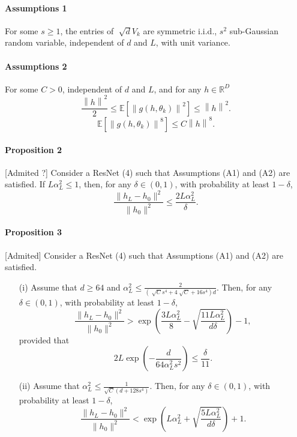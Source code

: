 \documentclass{report}
\theoremstyle{plain}%
\theoremstyle{definition}
\theoremstyle{remark}
\begin{document}
\paragraph*{Assumptions 1}
For some $ s \geq 1 $, the entries of $ \sqrt[]{d}V_k $ are symmetric i.i.d., $ s^2 $ sub-Gaussian random variable, independent of $ d $ and $ L $, with unit variance. 

\paragraph*{Assumptions 2}
For some $ C > 0 $, independent of $ d $ and $ L $, and for any $ h \in \mathbb{R}^D  $ 
\[
    \frac{\left\| h \right\| ^2}{2 } \leq  \mathbb{E }[ \left\|  g(h, \theta _ k ) \right\| ^2 ] \leq \left\| h \right\| ^2
.\]
\[
    \mathbb{E } [\left\| g(h, \theta _k)  \right\| ^8 ]\leq C \left\| h  \right\| ^8
.\]

\paragraph*{Proposition 2}[Admited ?]  Consider a ResNet (4) such that Assumptions (A1) and (A2) are satisfied.
If \( L\alpha_L^2 \leq 1 \), then, for any \( \delta \in (0, 1) \), with probability at least \( 1 - \delta \),
\[
\frac{\|h_L - h_0\|^2}{\|h_0\|^2} \leq \frac{2L\alpha_L^2}{\delta}.
\]

\paragraph*{Proposition 3}[Admited] Consider a ResNet (4) such that Assumptions (A1) and (A2) are satisfied.
\begin{itemize}
    \item[(i)] Assume that $d \geq 64$ and $ \alpha _L ^2 \leq  \frac{2 }{(\sqrt[]{C } s^4 + 4 \sqrt[]{C } + 16 s ^4)d}$. Then, for any $\delta \in (0, 1)$, with probability at least $1 - \delta$,
    \[
    \frac{\|h_L - h_0\|^2}{\|h_0\|^2} > \exp\left(\frac{3L\alpha_L^2}{8} - \sqrt{\frac{11L\alpha_L^2}{d\delta}}\right) - 1,
    \]
    provided that
    \[
    2L \exp\left(-\frac{d}{64\alpha_L^2s^2}\right) \leq \frac{\delta}{11}.
    \]

    \item[(ii)] Assume that $\alpha_L^2 \leq \frac{1}{\sqrt{C}(d + 128s^4)}$. Then, for any $\delta \in (0, 1)$, with probability at least $1 - \delta$,
    \[
    \frac{\|h_L - h_0\|^2}{\|h_0\|^2} < \exp\left(L\alpha_L^2 + \sqrt{\frac{5L\alpha_L^2}{d\delta}}\right) + 1.
    \]
\end{itemize}
\end{document}
